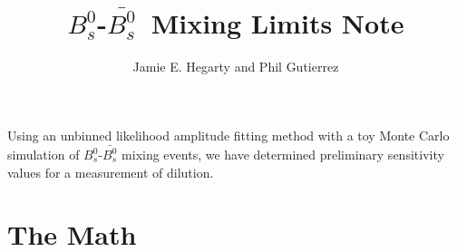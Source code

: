 \documentclass{article}
\newcommand{\Bs}{\mbox{$B_{s}^{0}$}}
\newcommand{\Bsbar}{\mbox{$\bar{B_{s}^{0}}$}}
\begin{document}
\title{\bf \Bs-\Bsbar\ Mixing Limits Note}

\author{Jamie E. Hegarty and  Phil Gutierrez}

\maketitle


\begin{center}
Using an unbinned likelihood amplitude fitting method with a toy Monte Carlo simulation of \mbox{\Bs-\Bsbar} mixing events, we have determined preliminary sensitivity values for a measurement of dilution.
\end{center}


\section{The Math}
\end{document}
